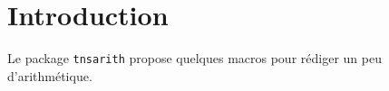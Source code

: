 \documentclass[12pt,a4paper]{article}
\begin{document}
\section{Introduction}

Le package \verb+tnsarith+ propose quelques macros pour rédiger un peu d'arithmétique.
\end{document}
